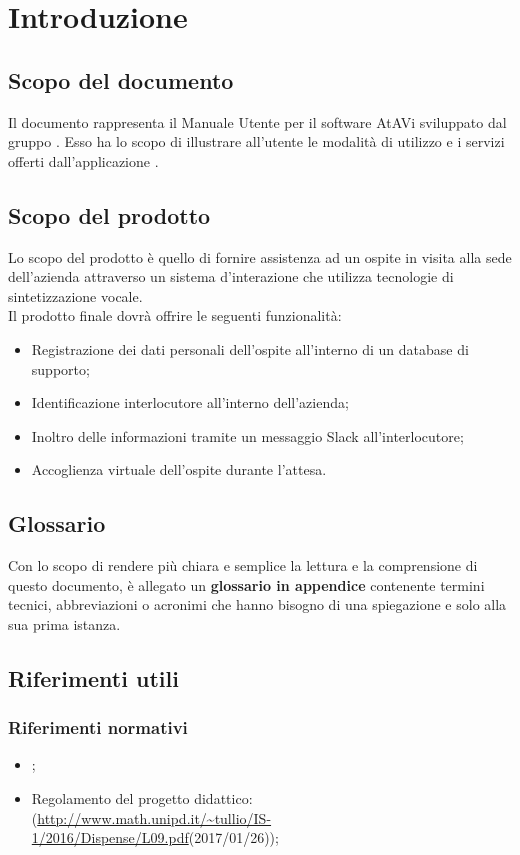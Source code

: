 \documentclass[../ManualeUtente_v2.0.0.tex]{subfiles}
\begin{document}
\section{Introduzione}

	\subsection{Scopo del documento}
	Il documento rappresenta il Manuale Utente per il software \gls{AtAVi} sviluppato dal gruppo \kpanic. Esso ha lo scopo di illustrare all'utente le modalità di utilizzo e i servizi offerti dall'applicazione \progetto.
	
	\subsection{Scopo del prodotto}
	Lo scopo del prodotto è quello di fornire assistenza ad un ospite in visita alla sede dell'azienda attraverso un sistema d'interazione che utilizza tecnologie di sintetizzazione vocale.
	\\Il prodotto finale dovrà offrire le seguenti funzionalità:
	\begin{itemize}
		\item Registrazione dei dati personali dell'ospite all'interno di un \gls{database} di supporto;
		\item Identificazione interlocutore all'interno dell'azienda;
		\item Inoltro delle informazioni tramite un messaggio \gls{Slack} all'interlocutore;
		\item Accoglienza virtuale dell'ospite durante l'attesa.
	\end{itemize}

	\subsection{Glossario}
	Con lo scopo di rendere più chiara e semplice la lettura e la comprensione di questo documento, è allegato un \textbf{glossario in appendice} contenente termini tecnici, abbreviazioni o acronimi che hanno bisogno di una spiegazione e solo alla sua prima istanza.

\newpage
	\subsection{Riferimenti utili}
		\subsubsection{Riferimenti normativi}
		\begin{itemize}
			\item \textit{\normediprogettov};
			\item Regolamento del progetto didattico:\\
			(\url{http://www.math.unipd.it/~tullio/IS-1/2016/Dispense/L09.pdf}(2017/01/26));
		\end{itemize}
	
\end{document}
